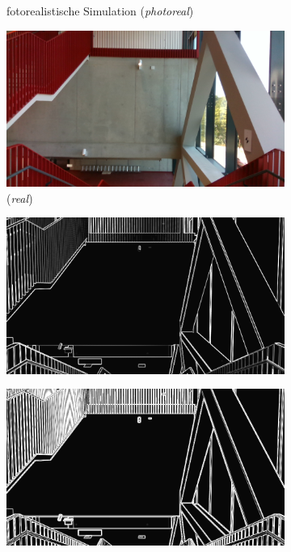 \begin{figure}
\begin{subfigure}[t]{0.24\linewidth}
		\caption{\RaggedRight fotorealistische Simulation \hspace{2cm} (\textit{photoreal})}
		\label{subfig:photorealistic}
	\end{subfigure}
	\hfill 
	\begin{subfigure}[t]{0.24\linewidth}
		\centering
		\includegraphics[width=\linewidth]{images/syn_dataset/r000089.png}
		\caption{ \hspace{2cm} (\textit{real})}
		\label{subfig:real}
	\end{subfigure}
	\hfill 
	\begin{subfigure}[t]{0.24\linewidth}
		\centering
		\includegraphics[width=\linewidth]{images/syn_dataset/bg00188.png}
		\caption{}
	\end{subfigure}
	\hfill
	\begin{subfigure}[t]{0.24\linewidth}
		\centering
		\includegraphics[width=\linewidth]{images/syn_dataset/eg00188.png}

\end{subfigure}
\end{figure}
